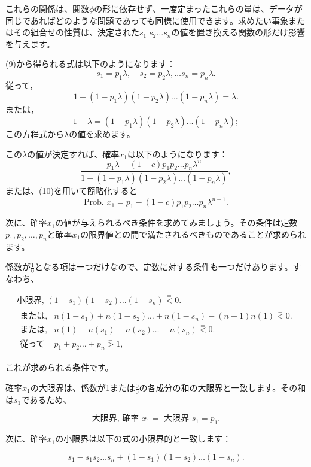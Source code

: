 \documentclass[a4paper,11pt,openany]{ltjsbook}
\begin{document}
これらの関係は、関数$\phi$の形に依存せず、一度定まったこれらの量は、データが同じであればどのような問題であっても同様に使用できます。求めたい事象またはその組合せの性質は、決定された$s_1 \; s_2 \dotsc s_n$の値を置き換える関数の形だけ影響を与えます。

(9)から得られる式は以下のようになります：
\[
  s_1 = p_1 \lambda, \quad
  s_2 = p_2 \lambda, \dotsc
  s_n = p_n \lambda.
\]
従って，
\[
  1 - (1 - p_1 \lambda)(1 - p_2 \lambda) \dotsc (1 - p_n \lambda)
 = \lambda.
\]
または，
\[
  1 - \lambda
  = (1 - p_1 \lambda)(1 - p_2 \lambda) \dotsc (1 - p_n \lambda);  \tag{10}
\]
この方程式から$\lambda$の値を求めます。

この$\lambda$の値が決定すれば、確率$x_1$は以下のようになります：
\[
  \frac{p_1\lambda - (1-c)p_1p_2 \dotsc p_n\lambda^n}
       {1 - (1-p_1\lambda)(1-p_2\lambda)\dotsc (1-p_n\lambda)},
\]
または、(10)を用いて簡略化すると
\[
  \text{Prob. }x_1 = p_1 - (1-c)p_1p_2 \dotsc p_n \lambda^{n-1}. \tag{11}
\]

次に、確率$x_1$の値が与えられるべき条件を求めてみましょう。その条件は定数$p_1, p_2, \dotsc, p_n$と確率$x_1$の限界値との間で満たされるべきものであることが求められます。

係数が$\frac{1}{0}$となる項は一つだけなので、定数に対する条件も一つだけあります。すなわち、

\begin{gather*}
  \text{小限界, } (1-s_1)(1-s_2) \dotsc (1-s_n)
    \stackrel{=}{<} 0. \\
  \begin{array}{cccccc}
   \text{または,} &
     n(1-s_1) + n(1-s_2) \dotsc + n(1-s_n) - (n-1)n(1)
     \stackrel{=}{<} 0. \\
   \text{または,} & n(1) - n(s_1) - n(s_2) \dotsc - n(s_n)
     \stackrel{=}{<} 0. \\
   \text{従って} & p_1 + p_2 \dotsc + p_n
     \stackrel{=}{>} 1,
  \end{array}
\end{gather*}

これが求められる条件です。

確率$x_1$の大限界は、係数が1または$\frac{0}{0}$の各成分の和の大限界と一致します。その和は$s_1$であるため、

\[
  \text{大限界, 確率 }x_1 = \text{ 大限界 }s_1 = p_1.
\]

次に、確率$x_1$の小限界は以下の式の小限界的と一致します：

\[
  s_1 - s_1 s_2 \dotsc s_n + (1-s_1)(1-s_2) \dotsc (1-s_n).
\]
\end{document}
